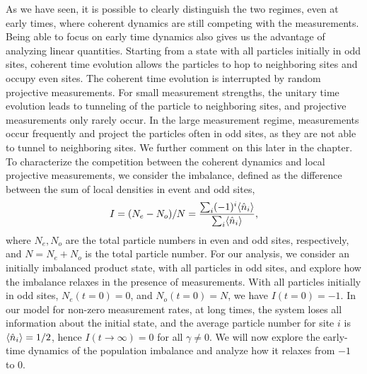 As we have seen, it is possible to clearly distinguish the two regimes, even at early times, where coherent dynamics are still competing with the measurements. Being able to focus on early time dynamics also gives us the advantage of analyzing linear quantities. Starting from a state with all particles initially in odd sites, coherent time evolution allows the particles to hop to neighboring sites and occupy even sites. The coherent time evolution is interrupted by random projective measurements. For small measurement strengths, the unitary time evolution leads to tunneling of the particle to neighboring sites, and projective measurements only rarely occur. In the large measurement regime, measurements occur frequently and project the particles often in odd sites, as they are not able to tunnel to neighboring sites. We further comment on this later in the chapter. To characterize the competition between the coherent dynamics and local projective measurements, we consider the imbalance, defined as the difference between the sum of local densities in event and odd sites,  
\begin{equation}
    \label{eq:imbalance}
    I = (N_e - N_o)/N = \frac{\sum_i (-1)^i \langle\hat{n}_i\rangle}{\sum_i  \langle\hat{n}_i\rangle},
\end{equation}
where $N_e, N_o$ are the total particle numbers in even and odd sites, respectively, and $N = N_e+N_o$ is the total particle number. For our analysis, we consider an initially imbalanced product state, with all particles in odd sites, and explore how the imbalance relaxes in the presence of measurements. With all particles initially in odd sites, $N_e(t=0) = 0$, and $N_o(t=0) = N$, we have $I(t=0) = -1$. In our model for non-zero measurement rates, at long times, the system loses all information about the initial state, and the average particle number for site $i$ is $\langle\hat{n}_i\rangle = 1/2$, hence $I(t\to \infty) = 0$ for all $\gamma \neq 0$. We will now explore the early-time dynamics of the population imbalance and analyze how it relaxes from $-1$ to $0$. 


